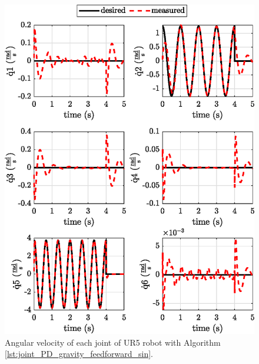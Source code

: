 \begin{figure}[H]
	\centering
	\includegraphics{images/act_1.7_sin/joint_velocity.eps}
	\caption{Angular velocity of each joint of UR5 robot with Algorithm \ref{lst:joint_PD_gravity_feedforward_sin}.}
	\label{fig:act_1.7_sin_joint_velocity}
\end{figure} 

